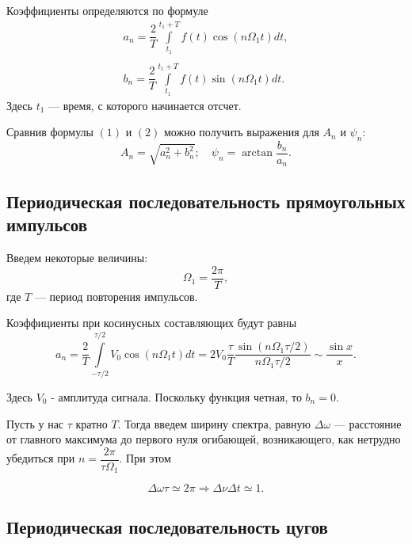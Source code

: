 \documentclass[a4paper]{article}
\theoremstyle{definition}
\theoremstyle{remark}
\begin{document}
\noindent Коэффициенты определяются по формуле
\begin{equation}
\begin{array}{c}
a_n  = \dfrac{2}{T}\int\limits_{t_1}^{t_1+T}f(t)\cos\left(n \Omega_1 t\right) dt,\\
\\
b_n = \dfrac{2}{T}\int\limits_{t_1}^{t_1+T}f(t)\sin\left(n \Omega_1 t\right) dt.
\end{array}
\end{equation}
Здесь $t_1$ --- время, с которого начинается отсчет.

\noindent Сравнив формулы $(1)$ и $(2)$ можно получить выражения для $A_n$  и $\psi_n$:
\begin{equation}
A_n = \sqrt{a_n^2+b_n^2}; \quad \psi_n = \arctan \dfrac{b_n}{a_n}.
\end{equation}

\subsection{Периодическая последовательность прямоугольных импульсов}

Введем некоторые величины:
\[\Omega_1 = \dfrac{2\pi}{T}, \]
где $T$ --- период повторения импульсов.

\noindent Коэффициенты при косинусных составляющих будут равны
\begin{equation}
a_n = \dfrac{2}{T}\int\limits_{-\tau/2}^{\tau/2}V_0\cos\left(n\Omega_1 t\right)dt = 2V_0\dfrac{\tau}{T}\dfrac{\sin\left(n\Omega_1\tau/2\right)}{n\Omega_1\tau/2} \sim \dfrac{\sin x}{x}.
\end{equation}

\noindent Здесь $V_0$ - амплитуда сигнала. Поскольку функция четная, то $b_n = 0$. 

\medskip

\noindent Пусть у нас $\tau$ кратно $T$. Тогда введем ширину спектра, равную $\Delta \omega$ --- расстояние от главного максимума до первого нуля огибающей, возникающего, как нетрудно убедиться при $n = \dfrac{2\pi}{\tau \Omega_1}$. При этом

\begin{equation}
\Delta \omega \tau \simeq 2\pi \Rightarrow \Delta \nu \Delta t \simeq 1.
\end{equation}

\subsection{Периодическая последовательность цугов}
\end{document}
